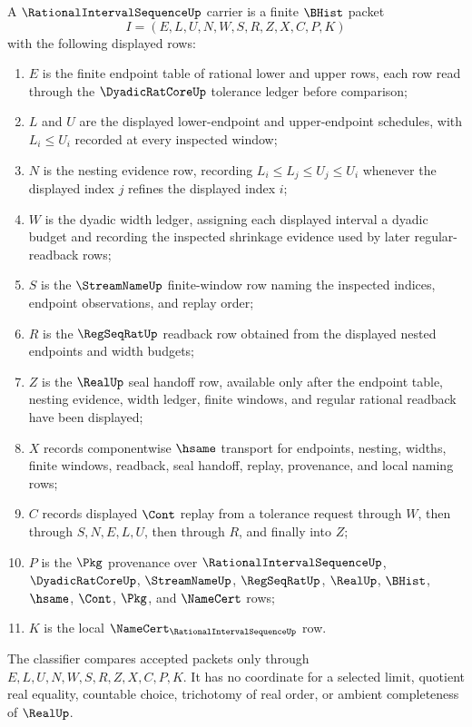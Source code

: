 \begin{definition}
\label{def:rational-interval-sequence-carrier}
A $\RationalIntervalSequenceUp$ carrier is a finite $\BHist$ packet
$$
I=(E,L,U,N,W,S,R,Z,X,C,P,K)
$$
with the following displayed rows:
\begin{enumerate}
\item $E$ is the finite endpoint table of rational lower and upper rows, each row read through the $\DyadicRatCoreUp$ tolerance ledger before comparison;
\item $L$ and $U$ are the displayed lower-endpoint and upper-endpoint schedules, with $L_i \leq U_i$ recorded at every inspected window;
\item $N$ is the nesting evidence row, recording $L_i \leq L_j \leq U_j \leq U_i$ whenever the displayed index $j$ refines the displayed index $i$;
\item $W$ is the dyadic width ledger, assigning each displayed interval a dyadic budget and recording the inspected shrinkage evidence used by later regular-readback rows;
\item $S$ is the $\StreamNameUp$ finite-window row naming the inspected indices, endpoint observations, and replay order;
\item $R$ is the $\RegSeqRatUp$ readback row obtained from the displayed nested endpoints and width budgets;
\item $Z$ is the $\RealUp$ seal handoff row, available only after the endpoint table, nesting evidence, width ledger, finite windows, and regular rational readback have been displayed;
\item $X$ records componentwise $\hsame$ transport for endpoints, nesting, widths, finite windows, readback, seal handoff, replay, provenance, and local naming rows;
\item $C$ records displayed $\Cont$ replay from a tolerance request through $W$, then through $S,N,E,L,U$, then through $R$, and finally into $Z$;
\item $P$ is the $\Pkg$ provenance over $\RationalIntervalSequenceUp$, $\DyadicRatCoreUp$, $\StreamNameUp$, $\RegSeqRatUp$, $\RealUp$, $\BHist$, $\hsame$, $\Cont$, $\Pkg$, and $\NameCert$ rows;
\item $K$ is the local $\NameCert_{\RationalIntervalSequenceUp}$ row.
\end{enumerate}
The classifier compares accepted packets only through $E,L,U,N,W,S,R,Z,X,C,P,K$. It has no coordinate for a selected limit, quotient real equality, countable choice, trichotomy of real order, or ambient completeness of $\RealUp$.
\end{definition}

